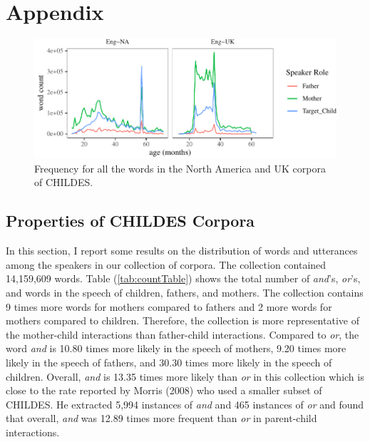 \documentclass[,man,floatsintext]{apa6}
\begin{document}
\hypertarget{appendix}{%
\section{Appendix}\label{appendix}}

\begin{figure}[tb]

{\centering \includegraphics{figs/corpusDensityPlot-1} 

}

\caption{Frequency for all the words in the North America and UK corpora of CHILDES.}\label{fig:corpusDensityPlot}
\end{figure}

\hypertarget{properties-of-childes-corpora}{%
\subsection{Properties of CHILDES Corpora}\label{properties-of-childes-corpora}}

In this section, I report some results on the distribution of words and utterances among the speakers in our collection of corpora. The collection contained 14,159,609 words. Table (\ref{tab:countTable}) shows the total number of \emph{and}'s, \emph{or}'s, and words in the speech of children, fathers, and mothers. The collection contains 9 times more words for mothers compared to fathers and 2 more words for mothers compared to children. Therefore, the collection is more representative of the mother-child interactions than father-child interactions. Compared to \emph{or}, the word \emph{and} is 10.80 times more likely in the speech of mothers, 9.20 times more likely in the speech of fathers, and 30.30 times more likely in the speech of children. Overall, \emph{and} is 13.35 times more likely than \emph{or} in this collection which is close to the rate reported by Morris (2008) who used a smaller subset of CHILDES. He extracted 5,994 instances of \emph{and} and 465 instances of \emph{or} and found that overall, \emph{and} was 12.89 times more frequent than \emph{or} in parent-child interactions.
\end{document}
